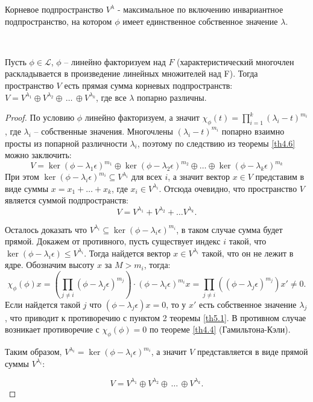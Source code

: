 \begin{corollary}
    Корневое подпространство $V^{\lambda}$ - максимальное по включению инвариантное подпространство, 
    на котором $\phi$ имеет единственное собственное значение $\lambda$.
\end{corollary}

\begin{theorem}~
    \label{th5.2}

    Пусть $\phi \in \mathcal{L}$, $\phi$ -- линейно факторизуем над $F$ 
    (характеристический многочлен раскладывается в произведение линейных множителей над F).
    Тогда пространство $V$ есть прямая сумма корневых подпространств: 
    $V = V^{\lambda_1} \oplus V^{\lambda_2} \oplus \, \dots \, \oplus V^{\lambda_k}$, где все $\lambda$ попарно различны.
\end{theorem}

\begin{proof}
    По условию $\phi$ линейно факторизуем, а значит
    $\chi_{\phi}(t) = \displaystyle\prod_{i= 1}^{k} (\lambda_i - t)^{m_i}$, где 
    $\lambda_i$ -- собственные значения. Многочлены $(\lambda_i - t)^{m_i}$ попарно взаимно просты 
    из попарной различности $\lambda_i$, поэтому по следствию из теоремы \ref{th4.6} можно заключить:
    $$V = \ker (\phi - \lambda_1 \epsilon)^{m_1} \oplus \ker (\phi - \lambda_2 \epsilon)^{m_2} 
    \oplus \dots \oplus \ker (\phi - \lambda_k \epsilon)^{m_k}$$
    При этом $\ker (\phi - \lambda_i \epsilon)^{m_i} \subseteq V^{\lambda_i}$ для всех $i$,
    а значит вектор $x \in V$ представим в виде суммы 
    $x = x_1 + \dots + x_k$, где $x_i \in V^{\lambda_i}$.
    Отсюда очевидно, что пространство $V$ является суммой подпространств: 
    $$V = V^{\lambda_1} + V^{\lambda_2} + \dots V^{\lambda_k}.$$ 
    
    Осталось доказать что $V^{\lambda_i} \subseteq \ker(\phi - \lambda_i \epsilon)^{m_i}$, 
    в таком случае сумма будет прямой. Докажем от противного, пусть существует индекс $i$ такой, 
    что $\ker (\phi - \lambda_i \epsilon) \leq V^{\lambda_i}$. Тогда найдется вектор 
    $x \in V^{\lambda_i}$ такой, что он не лежит в ядре. Обозначим высоту $x$ за $M > m_i$, тогда:
    $$\chi_{\phi}(\phi) x = \left(\displaystyle\prod_{j \neq i} (\phi - \lambda_j \epsilon)^{m_j}\right) \cdot 
    (\phi - \lambda_i \epsilon)^{m_i} x = \displaystyle\prod_{j \neq i} 
    ((\phi - \lambda_j \epsilon)^{m_j})x' \neq 0.$$ 
    Если найдется такой $j$ что $(\phi - \lambda_j \epsilon)x = 0$, то у $x'$ есть собственное значение
    $\lambda_j$, что приводит к противоречию с пунктом 2 теоремы \ref{th5.1}. 
    В противном случае возникает противоречие с 
    $\chi_{\phi}(\phi) = 0$ по теореме \ref{th4.4} (Гамильтона-Кэли). 

    Таким образом, $V^{\lambda_i} = \ker(\phi - \lambda_i \epsilon)^{m_i}$, а значит $V$ представляется 
    в виде прямой суммы $V^{\lambda_i}$:

    $$V = V^{\lambda_1} \oplus V^{\lambda_2} \oplus \, \dots \, \oplus V^{\lambda_k}.$$
\end{proof}

